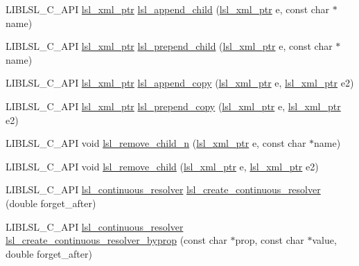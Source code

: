 \begin{DoxyCompactItemize}
\item 
L\+I\+B\+L\+S\+L\+\_\+\+C\+\_\+\+A\+PI \hyperlink{namespacelsl_a5edc7a49a1a1be1634fe6dce3d59c59b}{lsl\+\_\+xml\+\_\+ptr} \hyperlink{namespacelsl_a4e7b789b1a631d207683ba6fd821571f}{lsl\+\_\+append\+\_\+child} (\hyperlink{namespacelsl_a5edc7a49a1a1be1634fe6dce3d59c59b}{lsl\+\_\+xml\+\_\+ptr} e, const char $\ast$name)
\item 
L\+I\+B\+L\+S\+L\+\_\+\+C\+\_\+\+A\+PI \hyperlink{namespacelsl_a5edc7a49a1a1be1634fe6dce3d59c59b}{lsl\+\_\+xml\+\_\+ptr} \hyperlink{namespacelsl_ad5354d401fb5eb531d7b96ee9747f76a}{lsl\+\_\+prepend\+\_\+child} (\hyperlink{namespacelsl_a5edc7a49a1a1be1634fe6dce3d59c59b}{lsl\+\_\+xml\+\_\+ptr} e, const char $\ast$name)
\item 
L\+I\+B\+L\+S\+L\+\_\+\+C\+\_\+\+A\+PI \hyperlink{namespacelsl_a5edc7a49a1a1be1634fe6dce3d59c59b}{lsl\+\_\+xml\+\_\+ptr} \hyperlink{namespacelsl_a52061cbc108b95b34aa7d806d6115f91}{lsl\+\_\+append\+\_\+copy} (\hyperlink{namespacelsl_a5edc7a49a1a1be1634fe6dce3d59c59b}{lsl\+\_\+xml\+\_\+ptr} e, \hyperlink{namespacelsl_a5edc7a49a1a1be1634fe6dce3d59c59b}{lsl\+\_\+xml\+\_\+ptr} e2)
\item 
L\+I\+B\+L\+S\+L\+\_\+\+C\+\_\+\+A\+PI \hyperlink{namespacelsl_a5edc7a49a1a1be1634fe6dce3d59c59b}{lsl\+\_\+xml\+\_\+ptr} \hyperlink{namespacelsl_a6f0ee82a8282d19f01ddb2654f367e6c}{lsl\+\_\+prepend\+\_\+copy} (\hyperlink{namespacelsl_a5edc7a49a1a1be1634fe6dce3d59c59b}{lsl\+\_\+xml\+\_\+ptr} e, \hyperlink{namespacelsl_a5edc7a49a1a1be1634fe6dce3d59c59b}{lsl\+\_\+xml\+\_\+ptr} e2)
\item 
L\+I\+B\+L\+S\+L\+\_\+\+C\+\_\+\+A\+PI void \hyperlink{namespacelsl_a1a946a99964cbd500165fbd5f3d33766}{lsl\+\_\+remove\+\_\+child\+\_\+n} (\hyperlink{namespacelsl_a5edc7a49a1a1be1634fe6dce3d59c59b}{lsl\+\_\+xml\+\_\+ptr} e, const char $\ast$name)
\item 
L\+I\+B\+L\+S\+L\+\_\+\+C\+\_\+\+A\+PI void \hyperlink{namespacelsl_ad367e1e282a1fa614f44caaf113cf39c}{lsl\+\_\+remove\+\_\+child} (\hyperlink{namespacelsl_a5edc7a49a1a1be1634fe6dce3d59c59b}{lsl\+\_\+xml\+\_\+ptr} e, \hyperlink{namespacelsl_a5edc7a49a1a1be1634fe6dce3d59c59b}{lsl\+\_\+xml\+\_\+ptr} e2)
\item 
L\+I\+B\+L\+S\+L\+\_\+\+C\+\_\+\+A\+PI \hyperlink{namespacelsl_ab09ea0488f986f056322c3c866dc0a0f}{lsl\+\_\+continuous\+\_\+resolver} \hyperlink{namespacelsl_a8da66ce60f1720e808771e14337e4bdb}{lsl\+\_\+create\+\_\+continuous\+\_\+resolver} (double forget\+\_\+after)
\item 
L\+I\+B\+L\+S\+L\+\_\+\+C\+\_\+\+A\+PI \hyperlink{namespacelsl_ab09ea0488f986f056322c3c866dc0a0f}{lsl\+\_\+continuous\+\_\+resolver} \hyperlink{namespacelsl_a673d636b9a52467485a9ff6114bcafd6}{lsl\+\_\+create\+\_\+continuous\+\_\+resolver\+\_\+byprop} (const char $\ast$prop, const char $\ast$value, double forget\+\_\+after)

\end{DoxyCompactItemize}
